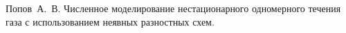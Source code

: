 \begin{thebibliography}{1}

  Попов~А.~В.
  Численное моделирование нестационарного одномерного течения газа с использованием неявных разностных схем. 

\end{thebibliography}


